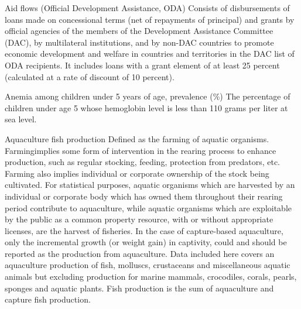 \begin{MetadataCollection} {}
\begin{metadata}{Aid flows (Official Development Assistance, ODA)} {}
Consists of disbursements of loans made on concessional terms (net of repayments of principal) and grants by official agencies of the members of the Development Assistance Committee (DAC), by multilateral institutions, and by non-DAC countries to promote economic development and welfare in countries and territories in the DAC list of ODA recipients. It includes loans with a grant element of at least 25 percent (calculated at a rate of discount of 10 percent). 
\end{metadata}

\begin{metadata}{Anemia among children under 5 years of age, prevalence (\%)} {}
The percentage of children under age 5 whose hemoglobin level is less than 110 grams per liter at sea level.
\end{metadata}

\begin{metadata}{Aquaculture fish production} {}
Defined as the farming of aquatic organisms. Farmingimplies some form of intervention in the rearing process to enhance production, such as regular stocking, feeding, protection from predators, etc. Farming also implies individual or corporate ownership of the stock being cultivated. For statistical purposes, aquatic organisms which are harvested by an individual or corporate body which has owned them throughout their rearing period contribute to aquaculture, while aquatic organisms which are exploitable by the public as a common property resource, with or without appropriate licenses, are the harvest of fisheries. In the case of capture-based aquaculture, only the incremental growth (or weight gain) in captivity, could and should be reported as the production from aquaculture. Data included here covers an aquaculture production of fish, molluscs, crustaceans and miscellaneous aquatic animals but excluding production for marine mammals, crocodiles, corals, pearls, sponges and aquatic plants. Fish production is the sum of aquaculture and capture fish production.
\end{metadata}


\end{MetadataCollection}
